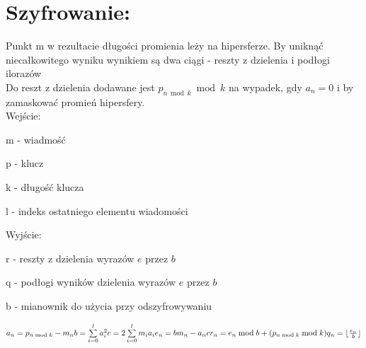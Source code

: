 \documentclass[11pt]{article}
\newcommand{\floor}[1]{\lfloor #1 \rfloor}
\begin{document}
	\section{Szyfrowanie:}
	Punkt m w rezultacie długości promienia leży na hipersferze.
	By uniknąć niecałkowitego wyniku wynikiem są dwa ciągi - reszty z dzielenia i podłogi ilorazów \\
	Do reszt z dzielenia dodawane jest \ensuremath{p_{n\bmod{k}}\bmod{k}} na wypadek, gdy \ensuremath{a_n = 0} i by zamaskować promień hipersfery. \\
	Wejście:
	\begin{description}
	\item m - wiadmość
	\item p - klucz
	\item k - długość klucza
	\item l - indeks ostatniego elementu wiadomości
	\end{description}
	Wyjście:
	\begin{description}
	\item r - reszty z dzielenia wyrazów \ensuremath{e} przez \ensuremath{b}
	\item q - podłogi wyników dzielenia wyrazów \ensuremath{e} przez \ensuremath{b}
	\item b - mianownik do użycia przy odszyfrowywaniu
	\end{description} 
	\ensuremath {
		a_n = p_{n \bmod{k}} - m_n \\
		b = \sum\limits_{i=0}^l a_i^2 \\
		c = 2\sum\limits_{i=0}^l m_ia_i \\
		e_n = bm_n - a_nc \\
		r_n = e_n\bmod{b} + (p_{n\bmod{k}}\bmod{k})  \\
		q_n = \floor{\frac{e_n}{b}}
	}
	\newpage
\end{document}
